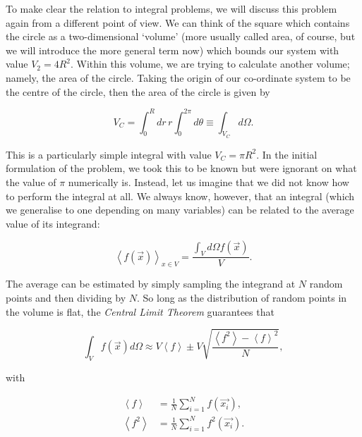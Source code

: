 To make clear the relation to integral problems, we will discuss this problem again from a different point of view. We can think of the square which contains the circle as a two-dimensional `volume' (more usually called area, of course, but we will introduce the more general term now) which bounds our system with value $V_2 = 4 R^2$. Within this volume, we are trying to calculate another volume; namely, the area of the circle. Taking the origin of our co-ordinate system to be the centre of the circle, then the area of the circle is given by

\begin{equation}
V_C = \int_0^R dr \hspace{2pt} r \int_0^{2 \pi} d \theta \equiv \int_{V_C} d \Omega.
\end{equation}

This is a particularly simple integral with value $V_C = \pi R^2$. In the initial formulation of the problem, we took this to be known but were ignorant on what the value of $\pi$ numerically is. Instead, let us imagine that we did not know how to perform the integral at all. We always know, however, that an integral (which we generalise to one depending on many variables) can be related to the average value of its integrand:

\begin{equation}
\left< f(\vec{x}) \right>_{x \in V} = \frac{\int_V d \Omega f(\vec{x})}{V}.
\end{equation}

The average can be estimated by simply sampling the integrand at $N$ random points and then dividing by $N$. So long as the distribution of random points in the volume is flat, the \emph{Central Limit Theorem} guarantees that

\begin{equation}
\int_V f(\vec{x}) d \Omega \approx V \left<f \right> \pm V \sqrt{\frac{\left<f^2 \right> - \left<f \right>^2}{N}},
\label{eqn:mcmaster}
\end{equation}

with

\begin{subequations}
\begin{align}
\left<f \right> &= \frac{1}{N} \sum_{i=1}^{N} f(\vec{x_i}), \\
\left<f^2 \right> &= \frac{1}{N} \sum_{i=1}^{N} f^2(\vec{x_i}).
\end{align}
\end{subequations}

